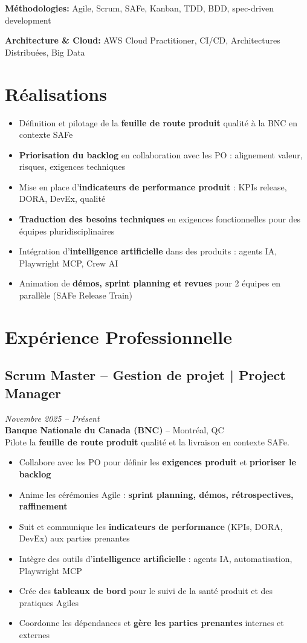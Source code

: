 \documentclass[11pt,a4paper]{article}
\begin{document}
\textbf{Méthodologies:} Agile, Scrum, SAFe, Kanban, TDD, BDD, spec-driven development

\textbf{Architecture \& Cloud:} AWS Cloud Practitioner, CI/CD, Architectures Distribuées, Big Data

\vspace{6pt}

\section*{Réalisations}
\begin{itemize}
    \item Définition et pilotage de la \textbf{feuille de route produit} qualité à la BNC en contexte SAFe
    \item \textbf{Priorisation du backlog} en collaboration avec les PO : alignement valeur, risques, exigences techniques
    \item Mise en place d'\textbf{indicateurs de performance produit} : KPIs release, DORA, DevEx, qualité
    \item \textbf{Traduction des besoins techniques} en exigences fonctionnelles pour des équipes pluridisciplinaires
    \item Intégration d'\textbf{intelligence artificielle} dans des produits : agents IA, Playwright MCP, Crew AI
    \item Animation de \textbf{démos, sprint planning et revues} pour 2 équipes en parallèle (SAFe Release Train)
\end{itemize}

\section*{Expérience Professionnelle}

\subsection*{Scrum Master -- Gestion de projet | Project Manager} \hfill \textit{Novembre 2025 -- Présent}\\
\textbf{Banque Nationale du Canada (BNC)} -- Montréal, QC\\
Pilote la \textbf{feuille de route produit} qualité et la livraison en contexte SAFe.
\begin{itemize}
    \item Collabore avec les PO pour définir les \textbf{exigences produit} et \textbf{prioriser le backlog}
    \item Anime les cérémonies Agile : \textbf{sprint planning, démos, rétrospectives, raffinement}
    \item Suit et communique les \textbf{indicateurs de performance} (KPIs, DORA, DevEx) aux parties prenantes
    \item Intègre des outils d'\textbf{intelligence artificielle} : agents IA, automatisation, Playwright MCP
    \item Crée des \textbf{tableaux de bord} pour le suivi de la santé produit et des pratiques Agiles
    \item Coordonne les dépendances et \textbf{gère les parties prenantes} internes et externes
\end{itemize}
\end{document}
